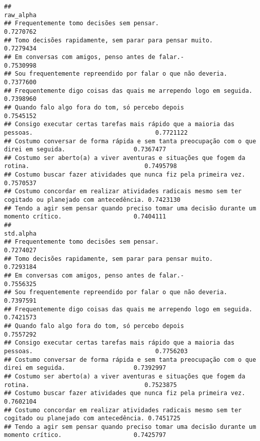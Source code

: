 \documentclass[
]{article}
\begin{document}
\begin{verbatim}
##                                                                                                         raw_alpha
## Frequentemente tomo decisões sem pensar.                                                                0.7270762
## Tomo decisões rapidamente, sem parar para pensar muito.                                                 0.7279434
## Em conversas com amigos, penso antes de falar.-                                                         0.7530998
## Sou frequentemente repreendido por falar o que não deveria.                                             0.7377600
## Frequentemente digo coisas das quais me arrependo logo em seguida.                                      0.7398960
## Quando falo algo fora do tom, só percebo depois                                                         0.7545152
## Consigo executar certas tarefas mais rápido que a maioria das pessoas.                                  0.7721122
## Costumo conversar de forma rápida e sem tanta preocupação com o que direi em seguida.                   0.7367477
## Costumo ser aberto(a) a viver aventuras e situações que fogem da rotina.                                0.7495798
## Costumo buscar fazer atividades que nunca fiz pela primeira vez.                                        0.7570537
## Costumo concordar em realizar atividades radicais mesmo sem ter cogitado ou planejado com antecedência. 0.7423130
## Tendo a agir sem pensar quando preciso tomar uma decisão durante um momento crítico.                    0.7404111
##                                                                                                         std.alpha
## Frequentemente tomo decisões sem pensar.                                                                0.7274027
## Tomo decisões rapidamente, sem parar para pensar muito.                                                 0.7293184
## Em conversas com amigos, penso antes de falar.-                                                         0.7556325
## Sou frequentemente repreendido por falar o que não deveria.                                             0.7397591
## Frequentemente digo coisas das quais me arrependo logo em seguida.                                      0.7421573
## Quando falo algo fora do tom, só percebo depois                                                         0.7557292
## Consigo executar certas tarefas mais rápido que a maioria das pessoas.                                  0.7756203
## Costumo conversar de forma rápida e sem tanta preocupação com o que direi em seguida.                   0.7392997
## Costumo ser aberto(a) a viver aventuras e situações que fogem da rotina.                                0.7523875
## Costumo buscar fazer atividades que nunca fiz pela primeira vez.                                        0.7602104
## Costumo concordar em realizar atividades radicais mesmo sem ter cogitado ou planejado com antecedência. 0.7451725
## Tendo a agir sem pensar quando preciso tomar uma decisão durante um momento crítico.                    0.7425797
\end{verbatim}
\end{document}

